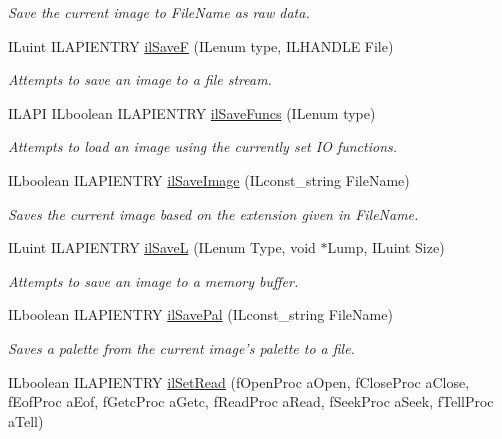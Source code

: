 \begin{DoxyCompactItemize}
\begin{DoxyCompactList}\small\item\em Save the current image to File\-Name as raw data. \end{DoxyCompactList}\item 
I\-Luint I\-L\-A\-P\-I\-E\-N\-T\-R\-Y \hyperlink{group__file_gae870510f45025e0ad59f4a40dcc49b86}{il\-Save\-F} (I\-Lenum type, I\-L\-H\-A\-N\-D\-L\-E File)
\begin{DoxyCompactList}\small\item\em Attempts to save an image to a file stream. \end{DoxyCompactList}\item 
I\-L\-A\-P\-I I\-Lboolean I\-L\-A\-P\-I\-E\-N\-T\-R\-Y \hyperlink{group__file_ga24f497da87676458f3913f7d2a4c0e85}{il\-Save\-Funcs} (I\-Lenum type)
\begin{DoxyCompactList}\small\item\em Attempts to load an image using the currently set I\-O functions. \end{DoxyCompactList}\item 
I\-Lboolean I\-L\-A\-P\-I\-E\-N\-T\-R\-Y \hyperlink{group__file_ga0e9284b1c258d2e8ae123eb3e330723b}{il\-Save\-Image} (I\-Lconst\-\_\-string File\-Name)
\begin{DoxyCompactList}\small\item\em Saves the current image based on the extension given in File\-Name. \end{DoxyCompactList}\item 
I\-Luint I\-L\-A\-P\-I\-E\-N\-T\-R\-Y \hyperlink{group__file_gab9b62589aceecd9c5e4b6ebfe326b181}{il\-Save\-L} (I\-Lenum Type, void $\ast$Lump, I\-Luint Size)
\begin{DoxyCompactList}\small\item\em Attempts to save an image to a memory buffer. \end{DoxyCompactList}\item 
\hypertarget{group__file_gafa4316e5d7b9a35bf872e7ddd2a8bb64}{I\-Lboolean I\-L\-A\-P\-I\-E\-N\-T\-R\-Y \hyperlink{group__file_gafa4316e5d7b9a35bf872e7ddd2a8bb64}{il\-Save\-Pal} (I\-Lconst\-\_\-string File\-Name)}\label{group__file_gafa4316e5d7b9a35bf872e7ddd2a8bb64}

\begin{DoxyCompactList}\small\item\em Saves a palette from the current image's palette to a file. \end{DoxyCompactList}\item 
\hypertarget{group__file_ga0da9f7a1b0cb90a147c1aad3f88f1278}{I\-Lboolean I\-L\-A\-P\-I\-E\-N\-T\-R\-Y \hyperlink{group__file_ga0da9f7a1b0cb90a147c1aad3f88f1278}{il\-Set\-Read} (f\-Open\-Proc a\-Open, f\-Close\-Proc a\-Close, f\-Eof\-Proc a\-Eof, f\-Getc\-Proc a\-Getc, f\-Read\-Proc a\-Read, f\-Seek\-Proc a\-Seek, f\-Tell\-Proc a\-Tell)}\label{group__file_ga0da9f7a1b0cb90a147c1aad3f88f1278}


\end{DoxyCompactItemize}
